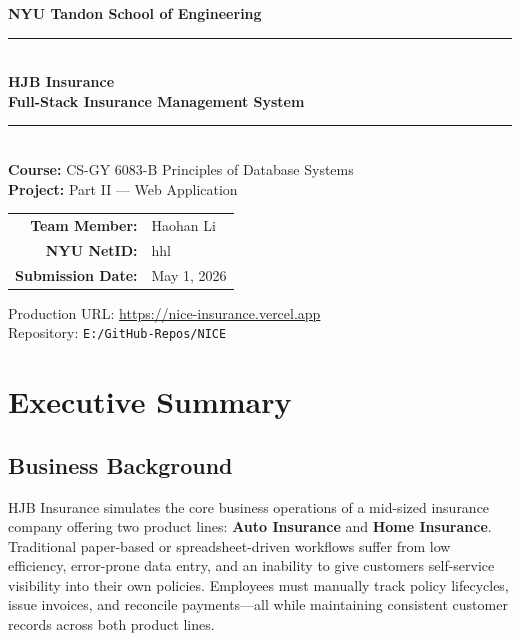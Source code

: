 \documentclass[12pt,letterpaper]{article}
\begin{document}
\begin{titlepage}
  \centering
  \vspace*{1.5cm}
  {\LARGE\bfseries NYU Tandon School of Engineering}\\[0.4cm]
  

  \rule{\linewidth}{2pt}\\[0.6cm]
  {\Huge\bfseries\color{njupurple} HJB Insurance}\\[0.4cm]
  {\Large\bfseries Full-Stack Insurance Management System}\\[0.2cm]
  \rule{\linewidth}{2pt}\\[1.5cm]

  {\large\textbf{Course:} CS-GY 6083-B \quad Principles of Database Systems}\\[0.3cm]
  {\large\textbf{Project:} Part II --- Web Application}\\[2.5cm]

  \begin{tabular}{rl}
    \textbf{Team Member:} & Haohan Li \\[0.2cm]
    \textbf{NYU NetID:}   & hhl \\[0.2cm]
    \textbf{Submission Date:} & May 1, 2026 \\
  \end{tabular}

  \vfill
  
  \vspace{0.5cm}
  {\small\color{gray}
    Production URL: \href{https://nice-insurance.vercel.app}{https://nice-insurance.vercel.app}\\
    Repository: \texttt{E:/GitHub-Repos/NICE}
  }
\end{titlepage}

\tableofcontents
\newpage

\section{Executive Summary}

\subsection{Business Background}

HJB Insurance simulates the core business operations of a mid-sized insurance company offering two product lines: \textbf{Auto Insurance} and \textbf{Home Insurance}. Traditional paper-based or spreadsheet-driven workflows suffer from low efficiency, error-prone data entry, and an inability to give customers self-service visibility into their own policies. Employees must manually track policy lifecycles, issue invoices, and reconcile payments—all while maintaining consistent customer records across both product lines.
\end{document}
